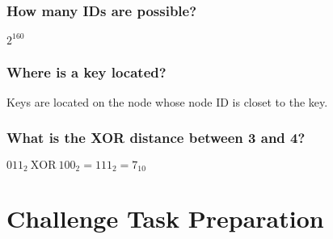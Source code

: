 \documentclass{article}
\begin{document}
\subsubsection{How many IDs are possible?}

$2^{160}$

\subsubsection{Where is a key located?}

Keys are located on the node whose node ID is closet to the key.

\subsubsection{What is the XOR distance between 3 and 4?}

${011}_2\ \text{XOR}\ {100}_2 = {111}_2 = 7_{10}$

\section{Challenge Task Preparation}


\end{document}
